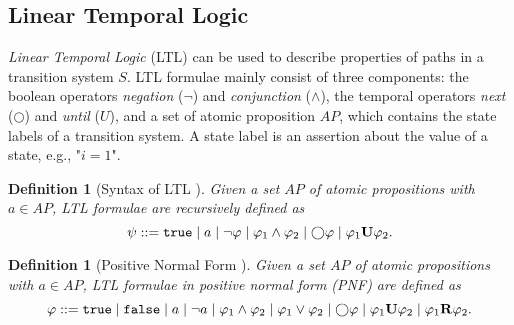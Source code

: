 \documentclass[a4paper, 12pt, twoside]{report}
\theoremstyle{plain}
\newtheorem{definition}[theorem]{Definition}
\begin{document}
	\subsection{Linear Temporal Logic}
	
	 
	\textit{Linear Temporal Logic} (LTL) can be used to describe properties of paths in a transition system $S$. LTL formulae mainly consist of three components: the boolean operators \textit{negation} ($\neg$) and \textit{conjunction} ($\wedge$), the temporal operators \textit{next} ($\bigcirc$) and \textit{until} ($U$), and a set of atomic proposition $AP$, which contains the state labels of a transition system. A state label is an assertion about the value of a state, e.g., "$i=1$". 
	
	\begin{definition}[Syntax of LTL \cite{baier2008principles}]\label{def:ltl_syntax}
		Given a set $AP$ of atomic propositions with $a \in AP$, \textup{LTL formulae} are recursively defined as
		\begin{equation*}		
			\psi ::= \texttt{\textup{true}} \mid a \mid \neg \varphi \mid \varphi_1 \wedge \varphi_2 \mid \bigcirc \varphi \mid \varphi_1 \textbf{\textup{U}} \varphi_2.
		\end{equation*}
	\end{definition}

	
	
	\begin{definition}[Positive Normal Form \cite{baier2008principles}]\label{def:ltl_pnf}
		Given a set $AP$ of atomic propositions with $a \in AP$, LTL formulae in \textup{positive normal form} (PNF) are defined as
		\begin{equation*}		
		\varphi ::= \texttt{\textup{true}} \mid \texttt{\textup{false}} \mid a \mid \neg a \mid \varphi_1 \wedge \varphi_2 \mid \varphi_1 \vee \varphi_2 \mid \bigcirc \varphi \mid \varphi_1 \textbf{\textup{U}} \varphi_2 \mid \varphi_1 \textbf{\textup{R}} \varphi_2.
		\end{equation*}
	\end{definition}

	
\end{document}

